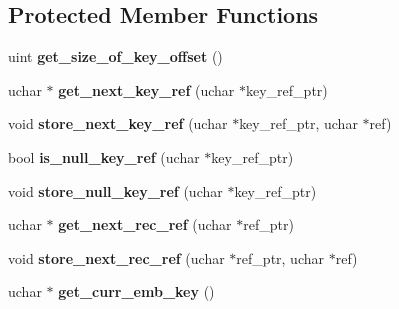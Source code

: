 \subsection*{Protected Member Functions}
\begin{DoxyCompactItemize}
\item 
\mbox{\label{classJOIN__CACHE__BKA__UNIQUE_ae3957db2d79039d7455480011f97e6c7}} 
uint {\bfseries get\+\_\+size\+\_\+of\+\_\+key\+\_\+offset} ()
\item 
\mbox{\label{classJOIN__CACHE__BKA__UNIQUE_a0072182d320c7268afb70eaee38d6575}} 
uchar $\ast$ {\bfseries get\+\_\+next\+\_\+key\+\_\+ref} (uchar $\ast$key\+\_\+ref\+\_\+ptr)
\item 
\mbox{\label{classJOIN__CACHE__BKA__UNIQUE_af46ffea53b70162a840e73db6d388fd3}} 
void {\bfseries store\+\_\+next\+\_\+key\+\_\+ref} (uchar $\ast$key\+\_\+ref\+\_\+ptr, uchar $\ast$ref)
\item 
\mbox{\label{classJOIN__CACHE__BKA__UNIQUE_a2f83ada137bc4fc27915ebd5b49c9963}} 
bool {\bfseries is\+\_\+null\+\_\+key\+\_\+ref} (uchar $\ast$key\+\_\+ref\+\_\+ptr)
\item 
\mbox{\label{classJOIN__CACHE__BKA__UNIQUE_ada71ff0da51c803f8039b9397441bf17}} 
void {\bfseries store\+\_\+null\+\_\+key\+\_\+ref} (uchar $\ast$key\+\_\+ref\+\_\+ptr)
\item 
\mbox{\label{classJOIN__CACHE__BKA__UNIQUE_a8a6747505360c6fb4e4665ab58832161}} 
uchar $\ast$ {\bfseries get\+\_\+next\+\_\+rec\+\_\+ref} (uchar $\ast$ref\+\_\+ptr)
\item 
\mbox{\label{classJOIN__CACHE__BKA__UNIQUE_a5f715975aa5d4057b18a6e41fa598399}} 
void {\bfseries store\+\_\+next\+\_\+rec\+\_\+ref} (uchar $\ast$ref\+\_\+ptr, uchar $\ast$ref)
\item 
\mbox{\label{classJOIN__CACHE__BKA__UNIQUE_a886ebe5449a47d80480e7d28fd81128b}} 
uchar $\ast$ {\bfseries get\+\_\+curr\+\_\+emb\+\_\+key} ()
\item 

\end{DoxyCompactItemize}
